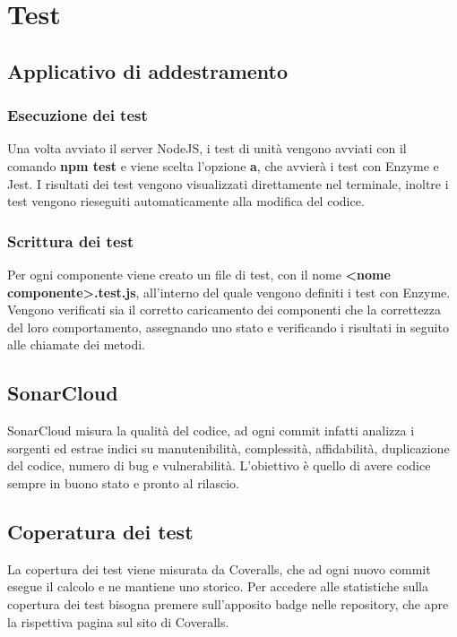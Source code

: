 \section{Test}
	\subsection{Applicativo di addestramento}
		\subsubsection{Esecuzione dei test}
			Una volta avviato il server NodeJS, i test di unità vengono avviati con il comando \textbf{npm test} e viene scelta l'opzione \textbf{a}, che avvierà i test con Enzyme e Jest. I risultati dei test vengono visualizzati direttamente nel terminale, inoltre i test vengono rieseguiti automaticamente alla modifica del codice.
		\subsubsection{Scrittura dei test}
			Per ogni componente viene creato un file di test, con il nome \textbf{<nome componente>.test.js}, all'interno del quale vengono definiti i test con Enzyme. Vengono verificati sia il corretto caricamento dei componenti che la correttezza del loro comportamento, assegnando uno stato e verificando i risultati in seguito alle chiamate dei metodi.
	\subsection{SonarCloud}
		SonarCloud misura la qualità del codice, ad ogni commit infatti analizza i sorgenti ed estrae indici su manutenibilità, complessità, affidabilità, duplicazione del codice, numero di bug e vulnerabilità. L'obiettivo è quello di avere codice sempre in buono stato e pronto al rilascio.
	\subsection{Coperatura dei test}
		La copertura dei test viene misurata da Coveralls, che ad ogni nuovo commit esegue il calcolo e ne mantiene uno storico. Per accedere alle statistiche sulla copertura dei test bisogna premere sull'apposito badge nelle repository\glo, che apre la rispettiva pagina sul sito di Coveralls.
